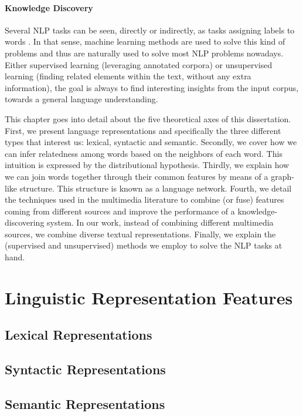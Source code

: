 \paragraph {Knowledge Discovery} Several NLP tasks can be seen, directly or indirectly, as tasks assigning labels to words \cite{Collobert2011}. In that sense, machine learning methods are used to solve this kind of problems and thus are naturally used to solve most NLP problems nowadays. Either supervised learning (leveraging annotated corpora) or unsupervised learning (finding related elements within the text, without any extra information), the goal is always to find interesting insights from the input corpus, towards a general language understanding. 

\begin{abstractchap}
This chapter goes into detail about the five theoretical axes of this dissertation. First, we present language representations and specifically the three different types that interest us: lexical, syntactic and semantic. Secondly, we cover how we can infer relatedness among words based on the neighbors of each word. This intuition is expressed by the distributional hypothesis. Thirdly, we explain how  we can join words together through their common features by means of a graph-like structure. This structure is known as a language network. Fourth, we detail the techniques used in the multimedia literature to combine (or fuse) features coming from different sources and improve the performance of a knowledge-discovering system. In our work, instead of combining different multimedia sources, we combine diverse textual representations. Finally, we explain the (supervised and unsupervised) methods we employ to solve the NLP tasks at hand.
\minitoc
\end{abstractchap}

\section{Linguistic Representation Features}
\subsection{Lexical Representations}
\subsection{Syntactic Representations}


\subsection{Semantic Representations}
